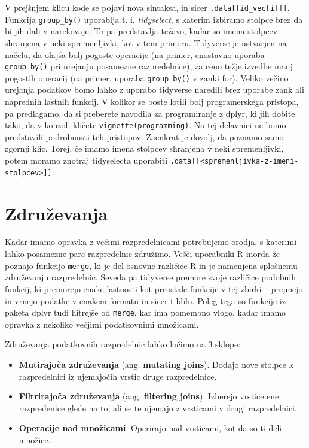 \documentclass[
]{book}
\providecommand{\tightlist}{%
  \setlength{\itemsep}{0pt}\setlength{\parskip}{0pt}}
\begin{document}
V prejšnjem klicu kode se pojavi nova sintaksa, in sicer \texttt{.data{[}{[}id\_vec{[}i{]}{]}{]}}. Funkcija \texttt{group\_by()} uporablja t. i. \emph{tidyselect}, s katerim izbiramo stolpce brez da bi jih dali v narekovaje. To pa predstavlja težavo, kadar so imena stolpcev shranjena v neki spremenljivki, kot v tem primeru. Tidyverse je ustvarjen na načelu, da olajša bolj pogoste operacije (na primer, enostavno uporaba \texttt{group\_by()} pri urejanju posamezne razpredelnice), za ceno težje izvedbe manj pogostih operacij (na primer, uporaba \texttt{group\_by()} v zanki for). Veliko večino urejanja podatkov bomo lahko z uporabo tidyverse naredili brez uporabe zank ali naprednih lastnih funkcij. V kolikor se boste lotili bolj programerskega pristopa, pa predlagamo, da si preberete navodila za programiranje z dplyr, ki jih dobite tako, da v konzoli kličete \texttt{vignette(\textquotesingle{}programming\textquotesingle{})}. Na tej delavnici ne bomo predstavili podrobnosti teh pristopov. Zaenkrat je dovolj, da poznamo samo zgornji klic. Torej, če imamo imena stolpcev shranjena v neki spremenljivki, potem moramo znotraj tidyselecta uporabiti \texttt{.data{[}{[}\textless{}spremenljivka-z-imeni-stolpcev\textgreater{}{]}{]}}.

\hypertarget{zdruux17eevanja}{%
\section{Združevanja}\label{zdruux17eevanja}}

Kadar imamo opravka z večimi razpredelnicami potrebujemo orodja, s katerimi lahko posamezne pare razpredelnic združimo. Vešči uporabniki R morda že poznajo funkcijo \texttt{merge}, ki je del osnovne različice R in je namenjena splošnemu združevanju razpredelnic. Seveda pa tidyverse premore svoje različice podobnih funkcij, ki premorejo enake lastnosti kot preostale funkcije v tej zbirki -- prejmejo in vrnejo podatke v enakem formatu in sicer tibblu. Poleg tega so funkcije iz paketa dplyr tudi hitrejše od \texttt{merge}, kar ima pomembno vlogo, kadar imamo opravka z nekoliko večjimi podatkovnimi množicami.

Združevanja podatkovnih razpredelnic lahko ločimo na 3 sklope:

\begin{itemize}
\tightlist
\item
  \textbf{Mutirajoča združevanja} (ang. \textbf{mutating joins}). Dodajo nove stolpce k razpredelnici iz ujemajočih vrstic druge razpredelnice.
\item
  \textbf{Filtrirajoča združevanja} (ang. \textbf{filtering joins}). Izberejo vrstice ene razpredenice glede na to, ali se te ujemajo z vrsticami v drugi razpredelnici.
\item
  \textbf{Operacije nad množicami}. Operirajo nad vrsticami, kot da so ti deli množice.
\end{itemize}
\end{document}
